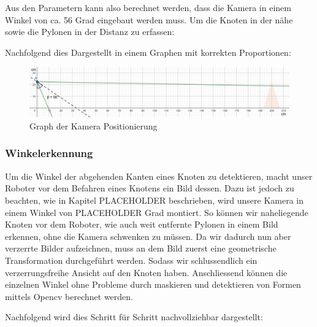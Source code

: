 Aus den Parametern kann also berechnet werden, dass die Kamera in einem Winkel von ca. 56 Grad eingebaut werden muss. Um die Knoten in der nähe sowie die Pylonen in der Distanz zu erfassen:

Nachfolgend dies Dargestellt in einem Graphen mit korrekten Proportionen:

\begin{figure}[H]
    \centering
    \includegraphics[width=1\linewidth]{assets/informatik-prototyp/camera/camera_position_exact_bigger.png}
    \caption{Graph der Kamera Positionierung}
    \label{fig:camera-position-exact}
\end{figure}





\subsubsection{Winkelerkennung}\label{winkelerkennung}

Um die Winkel der abgehenden Kanten eines Knoten zu detektieren, macht unser Roboter vor dem Befahren eines Knotens ein Bild dessen. Dazu ist jedoch zu beachten, wie in Kapitel PLACEHOLDER beschrieben, wird unsere Kamera in einem Winkel von PLACEHOLDER Grad montiert. So können wir naheliegende Knoten vor dem Roboter, wie auch weit entfernte Pylonen in einem Bild erkennen, ohne die Kamera schwenken zu müssen.
Da wir dadurch nun aber verzerrte Bilder aufzeichnen, muss an dem Bild zuerst eine geometrische Transformation durchgeführt werden. Sodass wir schlussendlich ein verzerrungsfreihe Ansicht auf den Knoten haben. Anschliessend können die einzelnen Winkel ohne Probleme durch maskieren und detektieren von Formen mittels Opencv berechnet werden.

Nachfolgend wird dies Schritt für Schritt nachvollziehbar dargestellt:

